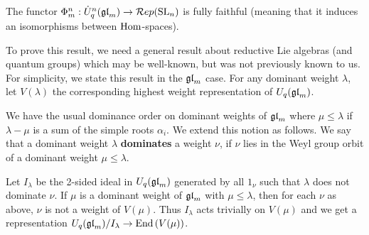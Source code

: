 \documentclass[10pt,leqno]{article}
\begin{document}
\begin{thm}\label{th:functorfullyfaithful}
The functor $\Phi_m^n: \dot{{{U}}}_q^n({\mathfrak{gl}}_m) \rightarrow \mathcal{R}ep({\rm{SL}}_n)$ is fully faithful (meaning that it induces an isomorphisms between $\operatorname{Hom}$-spaces).
\end{thm}

To prove this result, we need a general result about reductive Lie algebras (and quantum groups) which may be well-known, but was not previously known to us.   For simplicity, we state this result in the $ {\mathfrak{gl}}_m $ case.  For any dominant weight $ \lambda $, let $V(\lambda)$ the corresponding highest weight representation of $ U_q({\mathfrak{gl}}_m)$.




We have the usual dominance order on dominant weights of $ {\mathfrak{gl}}_m $ where $ \mu \le \lambda $ if $ \lambda - \mu $ is a sum of the simple roots $ \alpha_i $.  We extend this notion as follows.  We say that a dominant weight $ \lambda $ \textbf{dominates} a weight $ \nu $, if $ \nu $ lies in the Weyl group orbit of a dominant weight $ \mu \le \lambda $.

Let $ I_\lambda $ be the 2-sided ideal in $U_q({\mathfrak{gl}}_m)$ generated by all $ 1_\nu $ such that $ \lambda $ does not dominate $ \nu $. If $ \mu $ is a dominant weight of $ {\mathfrak{gl}}_m $ with $ \mu \le \lambda $, then for each $ \nu $ as above, $ \nu $ is not a weight of $V(\mu)$.  Thus $ I_\lambda $ acts trivially on $ V(\mu) $ and we get a representation $ U_q({\mathfrak{gl}}_m) / I_\lambda \rightarrow \operatorname{End}\left(V(\mu)\right) $.


\end{document}
